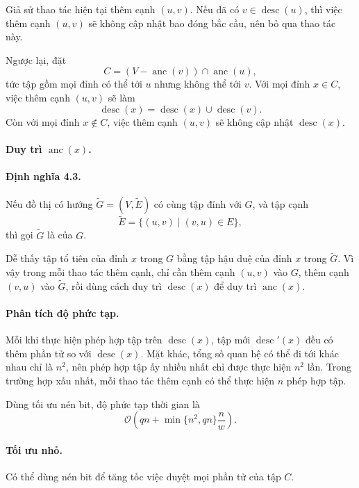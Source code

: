 \documentclass[11pt]{article}
\newcommand{\Oh}{\mathcal{O}}
\begin{document}
Giả sử thao tác hiện tại thêm cạnh \((u,v)\). Nếu đã có
\(v\in\operatorname{desc}(u)\), thì việc thêm cạnh \((u,v)\) sẽ không cập nhật
bao đóng bắc cầu, nên bỏ qua thao tác này.

Ngược lại, đặt
\[
  C=(V-\operatorname{anc}(v))\cap\operatorname{anc}(u),
\]
tức tập gồm mọi đỉnh có thể tới \(u\) nhưng không thể tới \(v\). Với mọi
đỉnh \(x\in C\), việc thêm cạnh \((u,v)\) sẽ làm
\[
  \operatorname{desc}(x)
  = \operatorname{desc}(x)\cup\operatorname{desc}(v).
\]
Còn với mọi đỉnh \(x\notin C\), việc thêm cạnh \((u,v)\) sẽ không cập nhật
\(\operatorname{desc}(x)\).

\paragraph{Duy trì \(\operatorname{anc}(x)\).}
\paragraph{Định nghĩa 4.3.}
Nếu đồ thị có hướng \(\widetilde G=(V,\widetilde E)\) có cùng tập đỉnh với
\(G\), và tập cạnh
\[
  \widetilde E=\{(u,v)\mid (v,u)\in E\},
\]
thì gọi \(\widetilde G\) là  của \(G\).

Dễ thấy tập tổ tiên của đỉnh \(x\) trong \(G\) bằng tập hậu duệ của đỉnh \(x\)
trong \(\widetilde G\). Vì vậy trong mỗi thao tác thêm cạnh, chỉ cần thêm
cạnh \((u,v)\) vào \(G\), thêm cạnh \((v,u)\) vào \(\widetilde G\), rồi dùng
cách duy trì \(\operatorname{desc}(x)\) để duy trì
\(\operatorname{anc}(x)\).

\paragraph{Phân tích độ phức tạp.}
Mỗi khi thực hiện phép hợp tập trên \(\operatorname{desc}(x)\), tập mới
\(\operatorname{desc}'(x)\) đều có thêm phần tử so với \(\operatorname{desc}(x)\).
Mặt khác, tổng số quan hệ có thể đi tới khác nhau chỉ là \(n^2\), nên phép hợp
tập ấy nhiều nhất chỉ được thực hiện \(n^2\) lần. Trong trường hợp xấu nhất,
mỗi thao tác thêm cạnh có thể thực hiện \(n\) phép hợp tập.

Dùng tối ưu nén bit, độ phức tạp thời gian là
\[
  \Oh\left(qn+\min\{n^2,qn\}\frac{n}{w}\right).
\]

\paragraph{Tối ưu nhỏ.}
Có thể dùng nén bit để tăng tốc việc duyệt mọi phần tử của tập \(C\).
\end{document}
